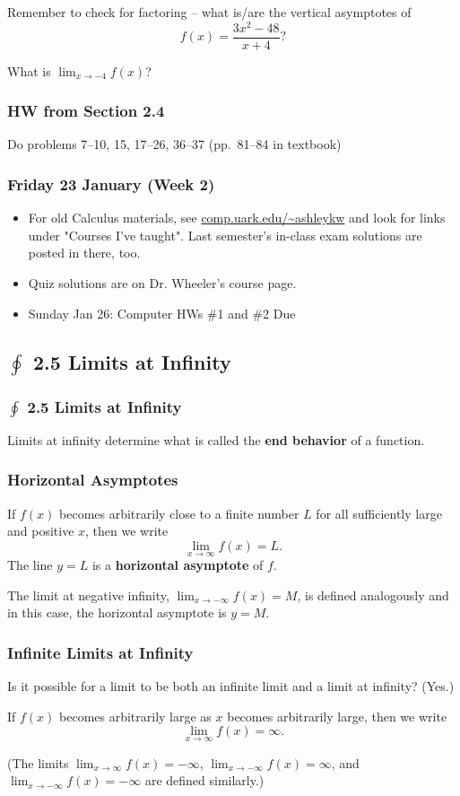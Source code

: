 \documentclass[14pt]{beamer}
\begin{document}
\begin{frame}
\frametitle{}
Remember to check for factoring -- what is/are the vertical asymptotes of 
\[f(x)=\frac{3x^2-48}{x+4} ?\]

\vspace{1pc}
What is $\displaystyle\lim_{x \to -4} f(x)$?  
\end{frame}

\begin{frame}
\frametitle{HW from Section 2.4}
Do problems 7--10, 15, 17--26, 36--37 (pp.\ 81--84 in textbook)
\end{frame}

\begin{frame}
\frametitle{Friday 23 January (Week 2)}
\begin{itemize}
\item For old Calculus materials, see \url{comp.uark.edu/~ashleykw} and look for links under "Courses I've taught".  Last semester's in-class exam solutions are posted in there, too.
\item Quiz solutions are on Dr. Wheeler's course page.
\item Sunday Jan 26:  Computer HWs \#1  and \#2 Due
\end{itemize}
\end{frame}

\begin{frame}
\subsection[2.5 Limits at Infinity]{$\oint$ 2.5 Limits at Infinity}
\frametitle{$\oint$ 2.5 Limits at Infinity}
Limits at infinity determine what is called the {\bf end behavior} of a function.
\end{frame}

\begin{frame}
\frametitle{\small Horizontal Asymptotes}
\footnotesize
If $f(x)$ becomes arbitrarily close to a finite number $L$ for all sufficiently large and positive $x$, then we write 
\[\lim_{x \to \infty}f(x)=L.\]
The line $y=L$ is a {\bf horizontal asymptote} of $f$.  

\vspace{3pc}
The limit at negative infinity, $\displaystyle\lim_{x \to -\infty}f(x)=M$, is defined analogously and in this case, the horizontal asymptote is $y=M$.
\end{frame}

\begin{frame}
\frametitle{\small Infinite Limits at Infinity}
\footnotesize
Is it possible for a limit to be both an infinite limit and a limit at infinity?  (Yes.)

\vspace{2pc}
If $f(x)$ becomes arbitrarily large as $x$ becomes arbitrarily large, then we write 
\[\displaystyle\lim_{x \to \infty}f(x)=\infty.\]  

\vspace{2pc}
(The limits 
$\displaystyle\lim_{x \to \infty}f(x)=-\infty$, $\displaystyle\lim_{x \to -\infty}f(x)=\infty$, and $\displaystyle\lim_{x \to -\infty} f(x)=-\infty$ are defined similarly.)
\end{frame}
\end{document}
